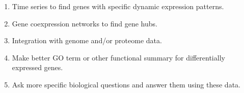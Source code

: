 \documentclass[12pt]{article}
\begin{document}
\begin{enumerate}
\item Time series to find genes with specific dynamic expression patterns.
\item Gene coexpression networks to find gene hubs.
\item Integration with genome and/or proteome data.
\item Make better GO term or other functional summary for differentially expressed genes. 
\item Ask more specific biological questions and answer them using these data. 
\end{enumerate}


\bigskip 

\small{\printbibliography}

\newpage %
\end{document}
